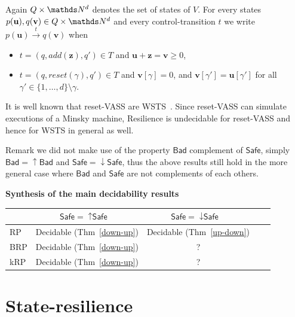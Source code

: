 \documentclass[runningheads]{llncs}
\newcommand{\Bad}{\textsf{Bad}}
\newcommand{\Safe}{\textsf{Safe}}
\begin{document}
Again $Q \times \N^d$
 denotes the set of states of $V$.
For every states $p(\textbf{u}), q(\textbf{v}) \in Q \times \N^d$ and every control-transition $t$ we write
$p(\textbf{u}) \xrightarrow{t} q(\textbf{v})$ when 
\begin{samepage}\begin{itemize}
\item  $t = (q,add(\textbf{z}),q') \in T$
and $\textbf{u}+\textbf{z} = \textbf{v} \geq 0$,
\item $t = (q,reset(\gamma),q') \in T$ 
and
$\textbf{v}[\gamma] = 0$, and $\textbf{v}[\gamma'] = \textbf{u}[\gamma']$ for all $\gamma' \in \{1,\ldots, d\} \setminus \gamma$.
\end{itemize} \end{samepage}

It is well known that reset-VASS are WSTS~\cite{dufourd1998reset}. 
Since reset-VASS can simulate executions of a Minsky machine, {\sc Resilience} is undecidable for reset-VASS and hence for WSTS in general as well.





Remark we did not make use of the
property $\Bad$ complement of $\Safe$, simply 
$\Bad=\uparrow \Bad$ and $\Safe=\downarrow \Safe$, thus 
the above results still hold in the more general case where $\Bad$ and $\Safe$ are not complements of each others.








{\bf Synthesis of the main decidability results}\label{synthesis}
\begin{center}
\begin{tabular}{ | l | c | c | c | r |}
\hline   \ 
		& $\Safe = {\uparrow \Safe}$~ 
		 & $\Safe = {\downarrow \Safe}$~ 
 \\ \hline
   RP 
   	& Decidable (Thm~\ref{down-up})  
   		 & Decidable (Thm~\ref{up-down}) 
    \\ \hline
   BRP 
   &  Decidable (Thm~\ref{down-up}) 
   		 & ?
    \\ \hline
      kRP 
      & Decidable (Thm~\ref{down-up}) 
      		& ? 
       \\ \hline
 \end{tabular}
\end{center}








\section{State-resilience}
\end{document}
